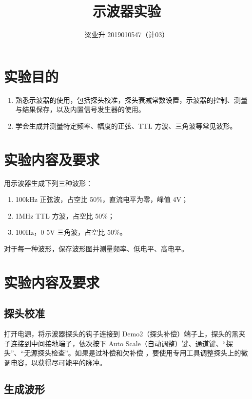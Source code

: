 \documentclass[a4paper]{article}
\begin{document}
\title{示波器实验}
\author{梁业升 2019010547（计03）}

\maketitle

\section{实验目的}

\begin{enumerate}
    \item 熟悉示波器的使用，包括探头校准，探头衰减常数设置，示波器的控制、测量与结果保存，以及内置信号发生器的使用。
    \item 学会生成并测量特定频率、幅度的正弦、TTL 方波、三角波等常见波形。
\end{enumerate}

\section{实验内容及要求}

用示波器生成下列三种波形：

\begin{enumerate}
    \item 100kHz 正弦波，占空比 50\%，直流电平为零，峰值 4V；
    \item 1MHz TTL 方波，占空比 50\%；
    \item 100Hz，0-5V 三角波，占空比 50\%。
\end{enumerate}

对于每一种波形，保存波形图并测量频率、低电平、高电平。

\section{实验内容及要求}

\subsection{探头校准}

打开电源，将示波器探头的钩子连接到 Demo2（探头补偿）端子上，探头的黑夹子连接到中间接地端子，依次按下 Auto Scale（自动调整）键、通道键、“探头”、“无源探头检查”。如果是过补偿和欠补偿 ，要使用专用工具调整探头上的微调电容，以获得尽可能平的脉冲。

\subsection{生成波形}
\end{document}
